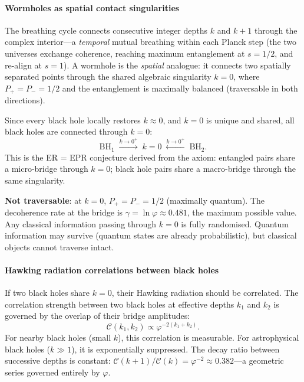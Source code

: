 \documentclass[12pt,a4paper]{article}
\begin{document}
\paragraph{Wormholes as spatial contact singularities}

The breathing cycle connects consecutive integer depths $k$ and $k+1$ through the complex interior---a \emph{temporal} mutual breathing within each Planck step (the two universes exchange coherence, reaching maximum entanglement at $s = 1/2$, and re-align at $s = 1$). A wormhole is the \emph{spatial} analogue: it connects two spatially separated points through the shared algebraic singularity $k = 0$, where $P_+ = P_- = 1/2$ and the entanglement is maximally balanced (traversable in both directions).

Since every black hole locally restores $k \approx 0$, and $k = 0$ is unique and shared, all black holes are connected through $k = 0$:
\begin{equation}
\text{BH}_1 \;\xrightarrow{k \to 0^+}\; k = 0 \;\xleftarrow{k \to 0^+}\; \text{BH}_2.
\end{equation}
This is the ER = EPR conjecture \cite{MaldacenaSusskind2013} derived from the axiom: entangled pairs share a micro-bridge through $k = 0$; black hole pairs share a macro-bridge through the same singularity.

\textbf{Not traversable}: at $k = 0$, $P_+ = P_- = 1/2$ (maximally quantum). The decoherence rate at the bridge is $\gamma = \ln \varphi \approx 0.481$, the maximum possible value. Any classical information passing through $k = 0$ is fully randomised. Quantum information may survive (quantum states are already probabilistic), but classical objects cannot traverse intact.
\paragraph{Hawking radiation correlations between black holes}

If two black holes share $k = 0$, their Hawking radiation should be correlated. The correlation strength between two black holes at effective depths $k_1$ and $k_2$ is governed by the overlap of their bridge amplitudes:
\begin{equation}
\mathcal{C}(k_1, k_2) \propto \varphi^{-2(k_1 + k_2)}.
\end{equation}
For nearby black holes (small $k$), this correlation is measurable. For astrophysical black holes ($k \gg 1$), it is exponentially suppressed. The decay ratio between successive depths is constant: $\mathcal{C}(k+1)/\mathcal{C}(k) = \varphi^{-2} \approx 0.382$---a geometric series governed entirely by $\varphi$.
\end{document}
